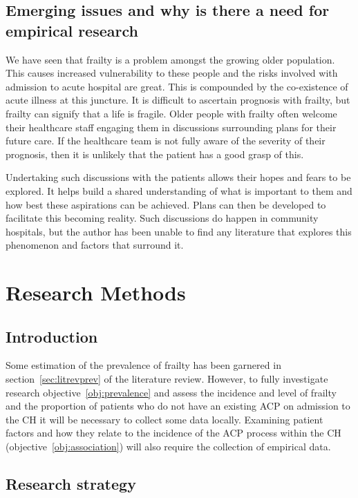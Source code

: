 \documentclass
[
	12pt,
	a4paper,
	oneside,
]{report}
\begin{document}
\section{Emerging issues and why is there a need for empirical 
research}

We have seen that frailty is a problem amongst the growing older population.
This causes increased vulnerability to these people and the risks involved with 
admission to acute hospital are great. This is compounded by the co-existence
of acute illness at this juncture. It is difficult to ascertain prognosis with 
frailty, but frailty can signify that a life is fragile. Older people with 
frailty often welcome their healthcare staff engaging them in discussions 
surrounding plans for their future care. If the healthcare team is not fully
aware of the severity of their prognosis, then it is unlikely that the patient
has a good grasp of this. 

Undertaking such discussions with the patients allows their hopes and fears to
be explored. It helps build a shared understanding of what is important to
them and how best these aspirations can be achieved. Plans can then be 
developed to facilitate this becoming reality. Such discussions do happen in
community hospitals, but the author has been unable to find any literature
that explores this phenomenon and factors that surround it.

\chapter{Research Methods}
 
\section{Introduction}

Some estimation of the prevalence of frailty has been garnered in 
section~\ref{sec:litrevprev} of the literature review. However, to fully
investigate research objective~\ref{obj:prevalence} and assess the incidence
and level of frailty and the proportion of patients who do not have an
existing ACP on admission to the CH it will be necessary to collect some
data locally. Examining patient factors and how they relate to the incidence of
the ACP process within the CH (objective~\ref{obj:association}) will
also require the collection of empirical data.

\section{Research strategy}
\end{document}
